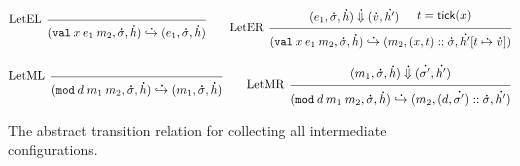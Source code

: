 \documentclass{article}
\theoremstyle{definition}
\newcommand*{\cons}{::}
\newcommand*{\A}[1]{\overset{{\,_{\mbox{\Large .}}}}{#1}}
\newcommand*{\modid}{d}
\newcommand*{\ctx}{\sigma}
\newcommand*{\mem}{h}
\newcommand*{\semarrow}{\hookrightarrow}
\newcommand*{\tick}{\mathsf{tick}}
\newcommand*{\Lete}{\mathtt{val}}
\newcommand*{\Letm}{\mathtt{mod}}
\begin{document}
\begin{figure}[h!]
  \[
    \begin{prooftree}
      \infer[left label=LetEL]0{
      (\Lete\:x\:e_1\:m_2, \A\ctx, \A\mem)
      \A\semarrow
      (e_{1}, \A\ctx, \A\mem)
      }
    \end{prooftree}\qquad
    \begin{prooftree}
      \hypo{
        \begin{matrix}
          (e_{1}, \A\ctx, \A\mem)
          \A\Downarrow
          (\A{v}, \A{\mem'})
        \end{matrix}
      }
      \hypo{
        \begin{matrix}
          t=\tick(x)
        \end{matrix}
      }
      \infer[left label=LetER]2{
      (\Lete\:x\:e_1\:m_2, \A\ctx, \A\mem)
      \A\semarrow
      (m_{2}, (x, t)\cons \A\ctx, \A{\mem'}[t\A\mapsto\A{v}])
      }
    \end{prooftree}
  \]

  \[
    \begin{prooftree}
      \infer[left label=LetML]0{
      (\Letm\:\modid\:m_{1}\:m_{2}, \A\ctx, \A\mem)
      \A\semarrow
      (m_{1}, \A\ctx, \A\mem)
      }
    \end{prooftree}\qquad
    \begin{prooftree}
      \hypo{
        \begin{matrix}
          (m_{1}, \A\ctx, \A\mem)
          \A\Downarrow
          (\A{\ctx'}, \A{\mem'})
        \end{matrix}
      }
      \infer[left label=LetMR]1{
      (\Letm\:\modid\:m_{1}\:m_{2}, \A\ctx, \A\mem)
      \A\semarrow
      (m_{2}, (\modid, \A{\ctx'})\cons \A\ctx, \A{\mem'})
      }
    \end{prooftree}
  \]
  \caption{The abstract transition relation for collecting all intermediate configurations.}
  \label{fig:absreach}
\end{figure}
\end{document}
